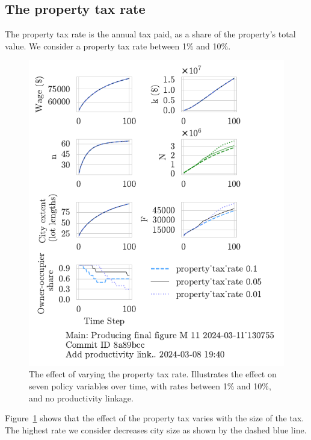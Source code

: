 \newpage



\subsection{The property tax rate}

The property tax rate is the annual tax paid, as a share of the property's total value. We consider a property tax rate between 1\% and 10\%.
\begin{figure}[h!b]
\centering
\includegraphics[scale=0.9, trim={0 1.4cm 0 0},clip]{fig/property_tax_rate-Main-130755.pdf}
\caption[The effect of varying the property tax rate]{The effect of varying the property tax rate. Illustrates the effect on seven policy variables over time, with rates between 1\% and 10\%, and no productivity linkage.}
\label{fig:property_tax_ownership_trajectory}
\end{figure}
Figure~\ref{fig:property_tax_ownership_trajectory} shows that the effect of the property tax varies with the size of the tax. The highest rate we consider decreases city size as shown by the dashed blue line. %
